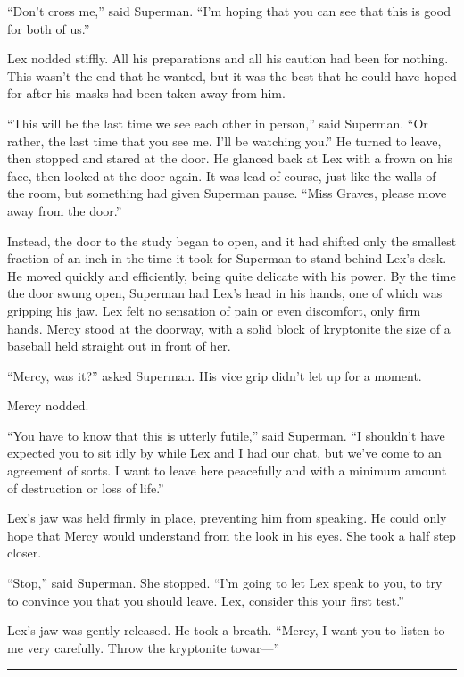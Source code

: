 ``Don't cross me,'' said Superman. ``I'm hoping that you can see that
this is good for both of us.''

Lex nodded stiffly. All his preparations and all his caution had been
for nothing. This wasn't the end that he wanted, but it was the best
that he could have hoped for after his masks had been taken away from
him.

``This will be the last time we see each other in person,'' said
Superman. ``Or rather, the last time that you see me. I'll be watching
you.'' He turned to leave, then stopped and stared at the door. He
glanced back at Lex with a frown on his face, then looked at the door
again. It was lead of course, just like the walls of the room, but
something had given Superman pause. ``Miss Graves, please move away from
the door.''

Instead, the door to the study began to open, and it had shifted only
the smallest fraction of an inch in the time it took for Superman to
stand behind Lex's desk. He moved quickly and efficiently, being quite
delicate with his power. By the time the door swung open, Superman had
Lex's head in his hands, one of which was gripping his jaw. Lex felt no
sensation of pain or even discomfort, only firm hands. Mercy stood at
the doorway, with a solid block of kryptonite the size of a baseball
held straight out in front of her.

``Mercy, was it?'' asked Superman. His vice grip didn't let up for a
moment.

Mercy nodded.

``You have to know that this is utterly futile,'' said Superman. ``I
shouldn't have expected you to sit idly by while Lex and I had our chat,
but we've come to an agreement of sorts. I want to leave here peacefully
and with a minimum amount of destruction or loss of life.''

Lex's jaw was held firmly in place, preventing him from speaking. He
could only hope that Mercy would understand from the look in his eyes.
She took a half step closer.

``Stop,'' said Superman. She stopped. ``I'm going to let Lex speak to
you, to try to convince you that you should leave. Lex, consider this
your first test.''

Lex's jaw was gently released. He took a breath. ``Mercy, I want you to
listen to me very carefully. Throw the kryptonite towar---''

\begin{center}\rule{0.5\linewidth}{0.5pt}\end{center}

